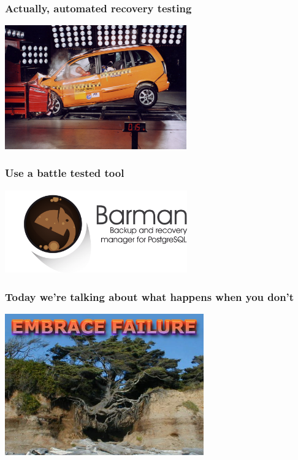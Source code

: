 \documentclass{beamer}
\begin{document}
\begin{frame}
  \frametitle{Actually, automated recovery testing}

  \begin{center}
    \includegraphics[height=2.1in]{crash-test.jpg}
  \end{center}
\end{frame}

\begin{frame}
  \frametitle{Use a battle tested tool}

  
  \begin{center}
    \includegraphics[height=1.4in]{pgbarman.png}
  \end{center}
\end{frame}

\begin{frame}
  \frametitle{Today we're talking about what happens when you don't}

  \begin{center}
    \includegraphics[height=2.4in]{resilience_logo.jpg}
  \end{center}
\end{frame}
\end{document}
